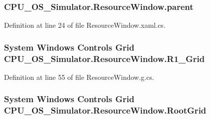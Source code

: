 \subsubsection[{parent}]{ C\+P\+U\+\_\+\+O\+S\+\_\+\+Simulator.\+Resource\+Window.\+parent\hspace{0.3cm}{\ttfamily [private]}}\label{class_c_p_u___o_s___simulator_1_1_resource_window_ae4e4c81a1aead3892b9848cb2cb87734}


Definition at line 24 of file Resource\+Window.\+xaml.\+cs.

\hypertarget{class_c_p_u___o_s___simulator_1_1_resource_window_af7214b3d17dc99bd806474accd886b1b}{}
\subsubsection[{R1\+\_\+\+Grid}]{\setlength{\rightskip}{0pt plus 5cm}System Windows Controls Grid C\+P\+U\+\_\+\+O\+S\+\_\+\+Simulator.\+Resource\+Window.\+R1\+\_\+\+Grid\hspace{0.3cm}{\ttfamily [package]}}\label{class_c_p_u___o_s___simulator_1_1_resource_window_af7214b3d17dc99bd806474accd886b1b}


Definition at line 55 of file Resource\+Window.\+g.\+cs.

\hypertarget{class_c_p_u___o_s___simulator_1_1_resource_window_ac52733ddcb1f45a5a5a4b7ced2c6a2d5}{}
\subsubsection[{Root\+Grid}]{\setlength{\rightskip}{0pt plus 5cm}System Windows Controls Grid C\+P\+U\+\_\+\+O\+S\+\_\+\+Simulator.\+Resource\+Window.\+Root\+Grid\hspace{0.3cm}{\ttfamily [package]}}\label{class_c_p_u___o_s___simulator_1_1_resource_window_ac52733ddcb1f45a5a5a4b7ced2c6a2d5}


